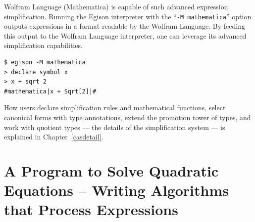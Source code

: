 Wolfram Language (Mathematica) is capable of such advanced expression simplification.
Running the Egison interpreter with the ``\texttt{-M mathematica}'' option outputs expressions in a format readable by the Wolfram Language.
By feeding this output to the Wolfram Language interpreter, one can leverage its advanced simplification capabilities.
\begin{lstlisting}[language=egison,numbers=none]
$ egison -M mathematica
> declare symbol x
> x + sqrt 2
#mathematica|x + Sqrt[2]|#
\end{lstlisting}

How users declare simplification rules and mathematical functions, select canonical forms with type annotations, extend the promotion tower of types, and work with quotient types --- the details of the simplification system --- is explained in Chapter~\ref{casdetail}.

\section{A Program to Solve Quadratic Equations -- Writing Algorithms that Process Expressions}\label{cas-quadratic}

